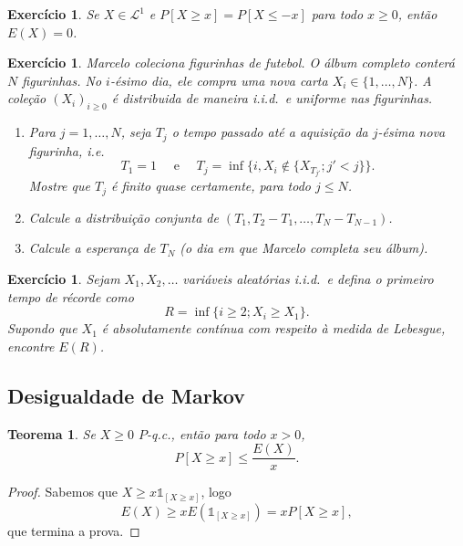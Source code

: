 \documentclass[reqno, final]{book}
\newcommand*\1{\mathds{1}}
\newtheorem{theorem}{Teorema}[section]
\newtheorem{exercise}[example]{Exercício}
\def \iid{i.i.d.~}
\begin{document}
\begin{exercise}
  Se $X \in \mathcal{L}^1$ e $P[X \geq x] = P[X \leq -x]$ para todo $x \geq 0$, então $E(X) = 0$.
\end{exercise}

\begin{exercise}
  Marcelo coleciona figurinhas de futebol.
  O álbum completo conter\'a $N$ figurinhas. No $i$-ésimo dia, ele compra uma nova carta $X_i \in \{1, \dots, N\}$.
  A cole\c{c}\~ao $(X_i)_{i \geq 0}$ é distribuida de maneira \iid e uniforme nas figurinhas.
  \begin{enumerate}[\quad a)]
  \item Para $j = 1, \dots, N$, seja $T_j$ o tempo passado até a aquisi\c{c}\~ao da $j$-ésima nova figurinha, i.e.
    \begin{equation}
      T_1 = 1 \quad \text{ e } \quad T_j = \inf\{i, X_i \not \in \{X_{T_{j'}}; j' < j\}\}.
    \end{equation}
    Mostre que $T_j$ é finito quase certamente, para todo $j \leq N$.
  \item Calcule a distribuição conjunta de $(T_1, T_2 - T_1, \dots, T_N - T_{N-1})$.
  \item Calcule a esperança de $T_N$ (o dia em que Marcelo completa seu álbum).
  \end{enumerate}
\end{exercise}

\begin{exercise}
  Sejam $X_1, X_2, \dots$ variáveis aleatórias \iid e defina o primeiro tempo de récorde como
  \begin{equation}
    R = \inf\{i \geq 2; X_i \geq X_1\}.
  \end{equation}
  Supondo que $X_1$ é absolutamente contínua com respeito à medida de Lebesgue, encontre $E(R)$.
\end{exercise}

\subsection{Desigualdade de Markov}

\begin{theorem}
  Se $X \geq 0$ $P$-q.c., então para todo $x > 0$,
  \begin{equation}
    P[X \geq x] \leq \frac{E(X)}{x}.
  \end{equation}
\end{theorem}

\begin{proof}
  Sabemos que $X \geq x \1_{[X \geq x]}$, logo
  \begin{equation}
    E(X) \geq x E(\1_{[X \geq x]}) = x P[X \geq x],
  \end{equation}
  que termina a prova.
\end{proof}
\end{document}
